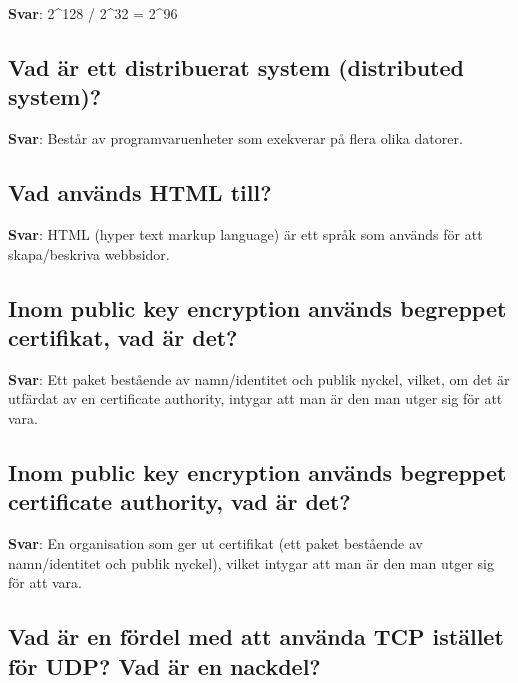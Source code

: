 \documentclass[a4paper,11pt,oneside]{article}
\begin{document}
\begin{sloppypar}
\label{q:158:sa:sv:True}

\textbf{Svar}: 2^128 / 2^32 = 2^96



\subsection{Vad \"ar ett distribuerat system (distributed system)?}

\label{q:159:sa:sv:True}

\textbf{Svar}: Best\r{a}r av programvaruenheter som exekverar p\r{a} flera olika datorer.



\subsection{Vad anv\"ands HTML till?}

\label{q:160:sa:sv:True}

\textbf{Svar}: HTML (hyper text markup language) \"ar ett spr\r{a}k som anv\"ands f\"or att skapa/beskriva webbsidor.



\subsection{Inom public key encryption anv\"ands begreppet certifikat, vad \"ar det?}

\label{q:161:sa:sv:True}

\textbf{Svar}: Ett paket best\r{a}ende av namn/identitet och publik nyckel, vilket, om det \"ar utf\"ardat av en certificate authority, intygar att man \"ar den man utger sig f\"or att vara.



\subsection{Inom public key encryption anv\"ands begreppet certificate authority, vad \"ar det?}

\label{q:162:sa:sv:True}

\textbf{Svar}: En organisation som ger ut certifikat (ett paket best\r{a}ende av namn/identitet och publik nyckel), vilket intygar att man \"ar den man utger sig f\"or att vara.



\subsection{Vad \"ar en f\"ordel med att anv\"anda TCP ist\"allet f\"or UDP? Vad \"ar en nackdel?}


\end{sloppypar}
\end{document}
